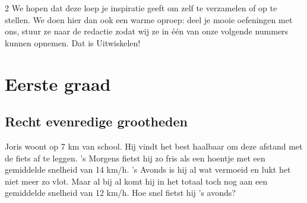 \begin{multicols}{2}
We hopen dat deze loep je inspiratie geeft om zelf  te verzamelen of op te stellen. We doen hier dan ook een warme oproep: deel je mooie oefeningen met ons, stuur ze naar de redactie zodat wij ze in één van onze volgende nummers kunnen opnemen. Dat is Uitwiskelen!

\end{multicols}

\section{Eerste graad}
\subsection{Recht evenredige grootheden}


Joris woont op 7 km van school. Hij vindt het best haalbaar om deze afstand met de fiets af te leggen. ’s Morgens fietst hij zo fris als een hoentje met een gemiddelde snelheid van 14 km/h. ’s Avonds is hij al wat vermoeid en lukt het niet meer zo vlot. Maar al bij al komt hij in het totaal toch nog aan een gemiddelde snelheid van 12 km/h. Hoe snel fietst hij ’s avonds?

\eindewerktekst

